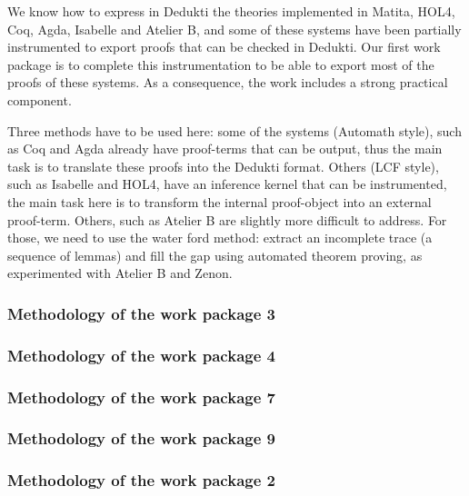 We know how to express in Dedukti the theories implemented in Matita,
HOL4, Coq, Agda, Isabelle and Atelier B, and some of these systems
have been partially instrumented to export proofs that can be checked
in Dedukti. Our first work package is to complete this instrumentation
to be able to export most of the proofs of these systems. As a
consequence, the work includes a strong practical component.

Three methods have to be used here: some of the systems (Automath
style), such as Coq and Agda already have proof-terms that can be
output, thus the main task is to translate these proofs into the
Dedukti format. Others (LCF style), such as Isabelle and HOL4, have an
inference kernel that can be instrumented, the main task here is to
transform the internal proof-object into an external
proof-term. Others, such as Atelier B are slightly more difficult to
address. For those, we need to use the water ford method: extract an
incomplete trace (a sequence of lemmas) and fill the gap using
automated theorem proving, as experimented with Atelier B and Zenon.


\subsubsection{Methodology of the work package 3}

\subsubsection{Methodology of the work package 4}

\subsubsection{Methodology of the work package 7}

\subsubsection{Methodology of the work package 9}

\subsubsection{Methodology of the work package 2}

